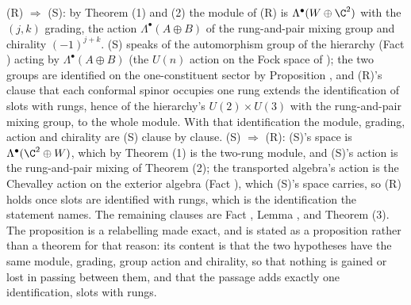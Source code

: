 (R) $\Rightarrow$ (S): by Theorem (1) and (2) the module of (R) is $\Lambda^{\bullet}(W \oplus \C^{2})$ with the $(j,k)$ grading, the action $\Lambda^{\bullet}(A \oplus B)$ of the rung-and-pair mixing group and chirality $(-1)^{j+k}$. (S) speaks of the automorphism group of the hierarchy (Fact ) acting by $\Lambda^{\bullet}(A \oplus B)$ (the $U(n)$ action on the Fock space of ); the two groups are identified on the one-constituent sector by Proposition , and (R)'s clause that each conformal spinor occupies one rung extends the identification of slots with rungs, hence of the hierarchy's $U(2) \times U(3)$ with the rung-and-pair mixing group, to the whole module. With that identification the module, grading, action and chirality are (S) clause by clause. (S) $\Rightarrow$ (R): (S)'s space is $\Lambda^{\bullet}(\C^{2} \oplus W)$, which by Theorem (1) is the two-rung module, and (S)'s action is the rung-and-pair mixing of Theorem (2); the transported algebra's action is the Chevalley action on the exterior algebra (Fact ), which (S)'s space carries, so (R) holds once slots are identified with rungs, which is the identification the statement names. The remaining clauses are Fact , Lemma , and Theorem (3). The proposition is a relabelling made exact, and is stated as a proposition rather than a theorem for that reason: its content is that the two hypotheses have the same module, grading, group action and chirality, so that nothing is gained or lost in passing between them, and that the passage adds exactly one identification, slots with rungs.
